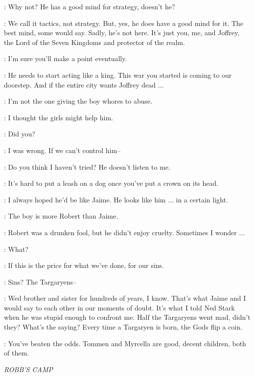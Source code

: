 \CERSEI: Why not? He has a good mind for strategy, doesn't he?

\TYRION: We call it tactics, not strategy. But, yes, he does have a good mind for it. The best mind, some would say. Sadly, he's not here. It's just you, me, and Joffrey, the Lord of the Seven Kingdoms and protector of the realm.

\CERSEI: I'm sure you'll make a point eventually.

\TYRION: He needs to start acting like a king. This war you started is coming to our doorstep. And if the entire city wants Joffrey dead $\ldots$

\CERSEI: I'm not the one giving the boy whores to abuse.

\TYRION: I thought the girls might help him.

\CERSEI: Did you?

\TYRION: I was wrong. If we can't control him--

\CERSEI: Do you think I haven't tried? He doesn't listen to me.

\TYRION: It's hard to put a leash on a dog once you've put a crown on its head.

\CERSEI: I always hoped he'd be like Jaime. He looks like him $\ldots$ in a certain light.

\TYRION: The boy is more Robert than Jaime.

\CERSEI: Robert was a drunken fool, but he didn't enjoy cruelty. Sometimes I wonder $\ldots$

\TYRION: What?

\CERSEI: If this is the price for what we've done, for our sins.

\TYRION: Sins? The Targaryens--

\CERSEI: Wed brother and sister for hundreds of years, I know. That's what Jaime and I would say to each other in our moments of doubt. It's what I told Ned Stark when he was stupid enough to confront me. Half the Targaryens went mad, didn't they? What's the saying? Every time a Targaryen is born, the Gods flip a coin.

\TYRION: You've beaten the odds. Tommen and Myrcella are good, decent children, both of them.



\scene

\textit{ROBB'S CAMP}


